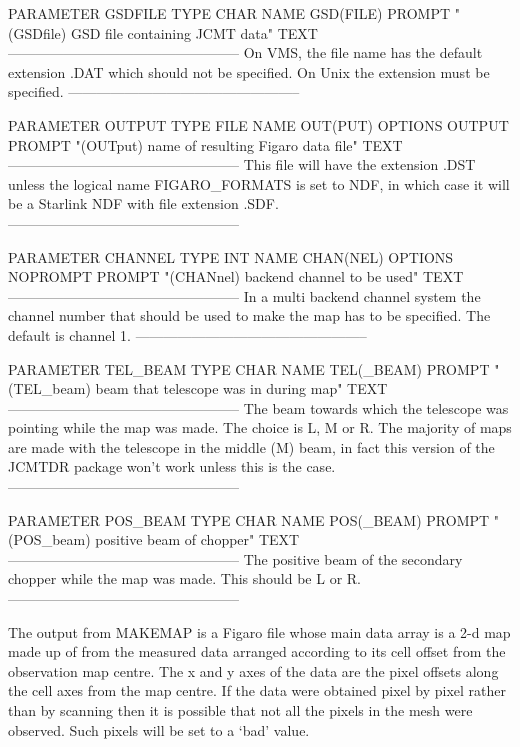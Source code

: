 \documentclass[twoside,11pt,nolof]{starlink}
\begin{document}
\begin{small}
\begin{terminalv}
PARAMETER  GSDFILE
  TYPE    CHAR
  NAME    GSD(FILE)
  PROMPT  "(GSDfile) GSD file containing JCMT data"
  TEXT    --------------------------------------------------
          On VMS, the file name has the default extension
          .DAT which should not be specified. On Unix the
          extension must be specified.
          --------------------------------------------------

PARAMETER  OUTPUT
  TYPE    FILE
  NAME    OUT(PUT)
  OPTIONS OUTPUT
  PROMPT  "(OUTput) name of resulting Figaro data file"
  TEXT    --------------------------------------------------
          This file will have the extension .DST unless the
          logical name FIGARO_FORMATS is set to NDF, in which
          case it will be a Starlink NDF with file extension
          .SDF.
          --------------------------------------------------

PARAMETER  CHANNEL
  TYPE    INT
  NAME    CHAN(NEL)
  OPTIONS NOPROMPT
  PROMPT  "(CHANnel) backend channel to be used"
  TEXT    --------------------------------------------------
          In a multi backend channel system the channel
          number that should be used to make the map has to
          be specified. The default is channel 1.
          --------------------------------------------------

PARAMETER  TEL_BEAM
  TYPE    CHAR
  NAME    TEL(_BEAM)
  PROMPT  "(TEL_beam) beam that telescope was in during map"
  TEXT    --------------------------------------------------
          The beam towards which the telescope was pointing
          while the map was made. The choice is L, M or R.
          The majority of maps are made with the telescope
          in the middle (M) beam, in fact this version of the
          JCMTDR package won't work unless this is the case.
          --------------------------------------------------

PARAMETER  POS_BEAM
  TYPE    CHAR
  NAME    POS(_BEAM)
  PROMPT  "(POS_beam) positive beam of chopper"
  TEXT    --------------------------------------------------
          The positive beam of the secondary chopper while
          the map was made. This should be L or R.
          --------------------------------------------------
\end{terminalv}
\end{small}

\goodbreak

The output from MAKEMAP is a Figaro file whose main data array is a
2-d map made up of from the measured data arranged according to its
cell offset from the observation map centre. The x and y axes of the
data are the pixel offsets along the cell axes from the map centre. If
the data were obtained pixel by pixel rather than by scanning then it
is possible that not all the pixels in the mesh were observed. Such
pixels will be set to a `bad' value.
\end{document}

